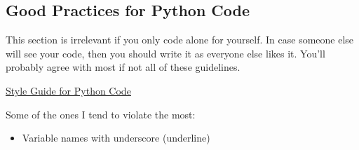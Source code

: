 \subsection{Good Practices for Python Code}

This section is irrelevant if you only code alone for yourself. In case someone else will see your code, then you should write it as everyone else likes it. You'll probably agree with most if not all of these guidelines.

\href{https://www.python.org/dev/peps/pep-0008/}{\ul{Style Guide for Python Code}}

Some of the ones I tend to violate the most:
\begin{itemize}
    \item Variable names with underscore (underline)
\end{itemize}
